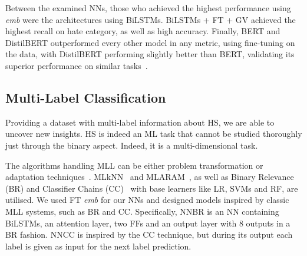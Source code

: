 \documentclass{article}
\begin{document}
Between the examined NNs, those who achieved the highest performance using \emph{emb} were the architectures using BiLSTMs. BiLSTMs + FT + GV achieved the highest recall on hate category, as well as high accuracy. Finally, BERT and DistilBERT outperformed every other model in any metric, using fine-tuning on the data, with DistilBERT performing slightly better than BERT, validating its superior performance on similar tasks~\cite{DBLP:conf/fire/RanasingheZH19}.

\subsection{Multi-Label Classification}
Providing a dataset with multi-label information about HS, we are able to uncover new insights. HS is indeed an ML task that cannot be studied thoroughly just through the binary aspect. Indeed, it is a multi-dimensional task.


The algorithms handling MLL can be either problem transformation or adaptation techniques~\cite{tsoum}. MLkNN~\cite{zhang2007ml} and MLARAM~\cite{MLARAM}, as well as Binary Relevance (BR) and Classifier Chains (CC)~\cite{read2009classifier} with base learners like LR, SVMs and RF, are utilised. We used FT \emph{emb} for our NNs and designed models inspired by classic MLL systems, such as BR and CC. Specifically, NNBR is an NN containing BiLSTMs, an attention layer, two FFs and an output layer with 8 outputs in a BR fashion. NNCC is inspired by the CC technique, but during its output each label is given as input for the next label prediction.
\end{document}
